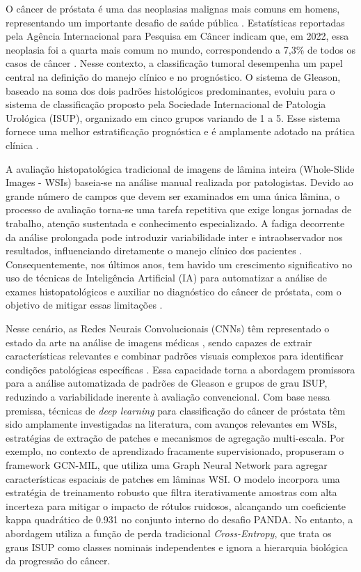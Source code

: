 O câncer de próstata é uma das neoplasias malignas mais comuns em homens, representando um importante desafio de saúde pública \cite{ref_siegel2024}. Estatísticas reportadas pela Agência Internacional para Pesquisa em Câncer indicam que, em 2022, essa neoplasia foi a quarta mais comum no mundo, correspondendo a 7,3\% de todos os casos de câncer \cite{JournalStatistic2024}. Nesse contexto, a classificação tumoral desempenha um papel central na definição do manejo clínico e no prognóstico. O sistema de Gleason, baseado na soma dos dois padrões histológicos predominantes, evoluiu para o sistema de classificação proposto pela Sociedade Internacional de Patologia Urológica (ISUP), organizado em cinco grupos variando de 1 a 5. Esse sistema fornece uma melhor estratificação prognóstica e é amplamente adotado na prática clínica \cite{ref-epstein2016}.

A avaliação histopatológica tradicional de imagens de lâmina inteira (Whole-Slide Images - WSIs) baseia-se na análise manual realizada por patologistas. Devido ao grande número de campos que devem ser examinados em uma única lâmina, o processo de avaliação torna-se uma tarefa repetitiva que exige longas jornadas de trabalho, atenção sustentada e conhecimento especializado. A fadiga decorrente da análise prolongada pode introduzir variabilidade inter e intraobservador nos resultados, influenciando diretamente o manejo clínico dos pacientes \cite{ref-bulten2020}. Consequentemente, nos últimos anos, tem havido um crescimento significativo no uso de técnicas de Inteligência Artificial (IA) para automatizar a análise de exames histopatológicos e auxiliar no diagnóstico do câncer de próstata, com o objetivo de mitigar essas limitações \cite{expert2022review}.

Nesse cenário, as Redes Neurais Convolucionais (CNNs) têm representado o estado da arte na análise de imagens médicas \cite{ref-campanella2019}, sendo capazes de extrair características relevantes e combinar padrões visuais complexos para identificar condições patológicas específicas \cite{araujo2021active}. Essa capacidade torna a abordagem promissora para a análise automatizada de padrões de Gleason e grupos de grau ISUP, reduzindo a variabilidade inerente à avaliação convencional. Com base nessa premissa, técnicas de \textit{deep learning} para classificação do câncer de próstata têm sido amplamente investigadas na literatura, com avanços relevantes em WSIs, estratégias de extração de patches e mecanismos de agregação multi-escala. Por exemplo, no contexto de aprendizado fracamente supervisionado, \cite{Xiang2023Prostate} propuseram o framework GCN-MIL, que utiliza uma Graph Neural Network para agregar características espaciais de patches em lâminas WSI. O modelo incorpora uma estratégia de treinamento robusto que filtra iterativamente amostras com alta incerteza para mitigar o impacto de rótulos ruidosos, alcançando um coeficiente kappa quadrático de 0.931 no conjunto interno do desafio PANDA. No entanto, a abordagem utiliza a função de perda tradicional \textit{Cross-Entropy}, que trata os graus ISUP como classes nominais independentes e ignora a hierarquia biológica da progressão do câncer.

